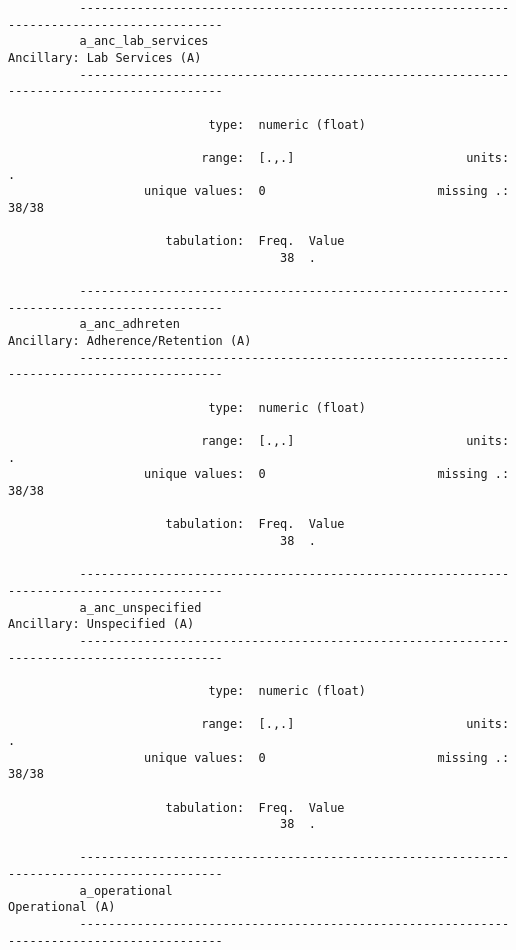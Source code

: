 \documentclass{article}
\begin{document}
\begin{verbatim}
          ------------------------------------------------------------------------------------------
          a_anc_lab_services                                             Ancillary: Lab Services (A)
          ------------------------------------------------------------------------------------------
          
                            type:  numeric (float)
          
                           range:  [.,.]                        units:  .
                   unique values:  0                        missing .:  38/38
          
                      tabulation:  Freq.  Value
                                      38  .
          
          ------------------------------------------------------------------------------------------
          a_anc_adhreten                                          Ancillary: Adherence/Retention (A)
          ------------------------------------------------------------------------------------------
          
                            type:  numeric (float)
          
                           range:  [.,.]                        units:  .
                   unique values:  0                        missing .:  38/38
          
                      tabulation:  Freq.  Value
                                      38  .
          
          ------------------------------------------------------------------------------------------
          a_anc_unspecified                                               Ancillary: Unspecified (A)
          ------------------------------------------------------------------------------------------
          
                            type:  numeric (float)
          
                           range:  [.,.]                        units:  .
                   unique values:  0                        missing .:  38/38
          
                      tabulation:  Freq.  Value
                                      38  .
          
          ------------------------------------------------------------------------------------------
          a_operational                                                              Operational (A)
          ------------------------------------------------------------------------------------------
          

\end{verbatim}
\end{document}
